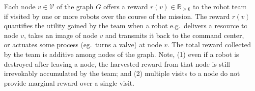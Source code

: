 \documentclass[11pt, oneside]{article}
\begin{document}



Each node $v\in \mathcal{V}$ of the graph $G$ offers a reward $r(v) \in  \mathbb{R}_{\geq 0}$ to the robot team if visited by one or more robots over the course of the mission.
The reward $r(v)$ quantifies the utility gained by the team when a robot e.g.\ delivers a resource to node $v$, takes an image of node $v$ and transmits it back to the command center, or actuates some process (eg.\ turns a valve) at node $v$. 
The total reward collected by the team is additive among nodes of the graph. %
Note, 
(1) even if a robot is destroyed after leaving a node, the harvested reward from that node is still irrevokably accumulated by the team; and
(2) multiple visits to a node do not provide marginal reward over a single visit. %




\end{document}
